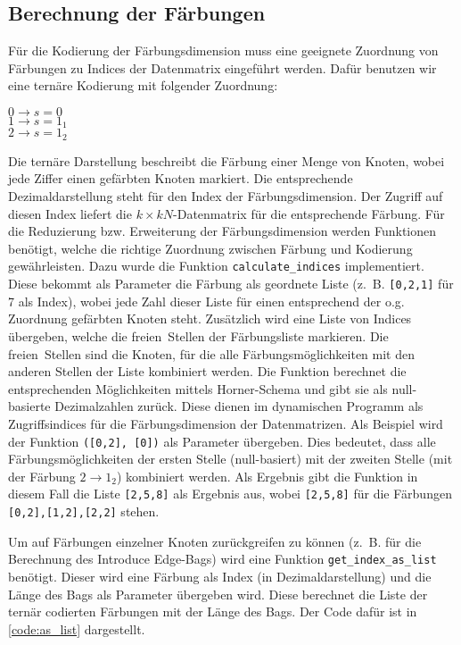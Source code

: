 \subsection{Berechnung der Färbungen}
\label{ssec:colors}
Für die Kodierung der Färbungsdimension muss eine geeignete Zuordnung von Färbungen zu Indices der Datenmatrix eingeführt werden. Dafür benutzen wir eine ternäre Kodierung mit folgender Zuordnung:
\begin{center}
$0 \rightarrow s=0$\\
$1 \rightarrow s=1_1$\\
$2 \rightarrow s=1_2$\\
\end{center}
Die ternäre Darstellung beschreibt die Färbung einer Menge von Knoten, wobei jede Ziffer einen gefärbten Knoten markiert. 
Die entsprechende Dezimaldarstellung steht für den Index der Färbungsdimension. 
Der Zugriff auf diesen Index liefert die $k \times kN$-Datenmatrix für die entsprechende Färbung.
Für die Reduzierung bzw. Erweiterung der Färbungsdimension werden Funktionen benötigt, welche die richtige Zuordnung zwischen Färbung und Kodierung gewährleisten.
Dazu wurde die Funktion \texttt{calculate\_indices} implementiert. 
Diese bekommt als Parameter die Färbung als geordnete Liste (z.~B. \texttt{[0,2,1]} für 7 als Index), wobei jede Zahl dieser Liste für einen entsprechend der o.g. Zuordnung gefärbten Knoten steht. 
Zusätzlich wird eine Liste von Indices übergeben, welche die \glqq freien\grqq ~Stellen der Färbungsliste markieren. 
Die \glqq freien\grqq ~Stellen sind die Knoten, für die alle Färbungsmöglichkeiten mit den anderen Stellen der Liste kombiniert werden. 
Die Funktion berechnet die entsprechenden Möglichkeiten mittels Horner-Schema und gibt sie als null-basierte Dezimalzahlen zurück. 
Diese dienen im dynamischen Programm als Zugriffsindices für die Färbungsdimension der Datenmatrizen. 
Als Beispiel wird der Funktion \texttt{([0,2], [0])} als Parameter übergeben. 
Dies bedeutet, dass alle Färbungsmöglichkeiten der ersten Stelle (null-basiert) mit der zweiten Stelle (mit der Färbung $2 \rightarrow 1_2$) kombiniert werden. 
Als Ergebnis gibt die Funktion in diesem Fall die Liste \texttt{[2,5,8]} als Ergebnis aus, wobei \texttt{[2,5,8]} für die Färbungen \texttt{[0,2],[1,2],[2,2]} stehen.

Um auf Färbungen einzelner Knoten zurückgreifen zu können (z.~B. für die Berechnung des \glqq Introduce Edge\grqq -Bags) wird eine Funktion \texttt{get\_index\_as\_list} benötigt. Dieser wird eine Färbung als Index (in Dezimaldarstellung) und die Länge des Bags als Parameter übergeben wird. Diese berechnet die Liste der ternär codierten Färbungen mit der Länge des Bags. Der Code dafür ist in \ref{code:as_list} dargestellt. 

